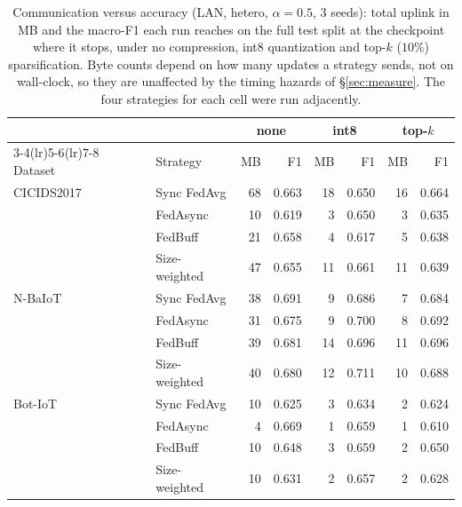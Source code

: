 \begin{table}[t]\centering
\caption{Communication versus accuracy (LAN, hetero, $\alpha{=}0.5$, 3 seeds):
total uplink in MB and the macro-F1 each run reaches on the full test split at
the checkpoint where it stops, under no compression, int8 quantization and
top-$k$ ($10\%$) sparsification. Byte counts depend on how many updates a
strategy sends, not on wall-clock, so they are unaffected by the timing
hazards of \S\ref{sec:measure}. The four strategies for each cell were run
adjacently.}
\label{tab:compression}
\begin{tabular}{ll rr rr rr}
\toprule
& & \multicolumn{2}{c}{none} & \multicolumn{2}{c}{int8} & \multicolumn{2}{c}{top-$k$} \\
\cmidrule(lr){3-4}\cmidrule(lr){5-6}\cmidrule(lr){7-8}
Dataset & Strategy & MB & F1 & MB & F1 & MB & F1 \\
\midrule
CICIDS2017 & Sync FedAvg & 68 & 0.663 & 18 & 0.650 & 16 & 0.664 \\
 & FedAsync & 10 & 0.619 & 3 & 0.650 & 3 & 0.635 \\
 & FedBuff & 21 & 0.658 & 4 & 0.617 & 5 & 0.638 \\
 & Size-weighted & 47 & 0.655 & 11 & 0.661 & 11 & 0.639 \\
\midrule
N-BaIoT & Sync FedAvg & 38 & 0.691 & 9 & 0.686 & 7 & 0.684 \\
 & FedAsync & 31 & 0.675 & 9 & 0.700 & 8 & 0.692 \\
 & FedBuff & 39 & 0.681 & 14 & 0.696 & 11 & 0.696 \\
 & Size-weighted & 40 & 0.680 & 12 & 0.711 & 10 & 0.688 \\
\midrule
Bot-IoT & Sync FedAvg & 10 & 0.625 & 3 & 0.634 & 2 & 0.624 \\
 & FedAsync & 4 & 0.669 & 1 & 0.659 & 1 & 0.610 \\
 & FedBuff & 10 & 0.648 & 3 & 0.659 & 2 & 0.650 \\
 & Size-weighted & 10 & 0.631 & 2 & 0.657 & 2 & 0.628 \\
\bottomrule
\end{tabular}
\end{table}
